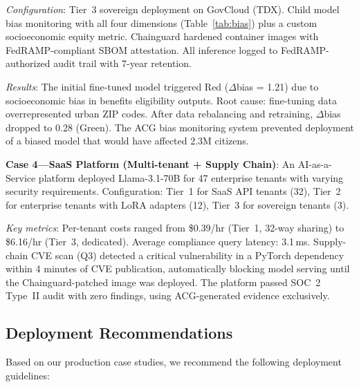 \documentclass[conference,10pt]{IEEEtran}
\begin{document}
\emph{Configuration}: Tier~3 sovereign deployment on GovCloud (TDX). Child model bias monitoring with all four dimensions (Table~\ref{tab:bias}) plus a custom socioeconomic equity metric. Chainguard hardened container images with FedRAMP-compliant SBOM attestation. All inference logged to FedRAMP-authorized audit trail with 7-year retention.

\emph{Results}: The initial fine-tuned model triggered Red ($\Delta$bias = 1.21) due to socioeconomic bias in benefits eligibility outputs. Root cause: fine-tuning data overrepresented urban ZIP codes. After data rebalancing and retraining, $\Delta$bias dropped to 0.28 (Green). The ACG bias monitoring system prevented deployment of a biased model that would have affected 2.3M citizens.

\textbf{Case 4---SaaS Platform (Multi-tenant + Supply Chain)}: An AI-as-a-Service platform deployed Llama-3.1-70B for 47 enterprise tenants with varying security requirements. Configuration: Tier~1 for SaaS API tenants (32), Tier~2 for enterprise tenants with LoRA adapters (12), Tier~3 for sovereign tenants (3).

\emph{Key metrics}: Per-tenant costs ranged from \$0.39/hr (Tier~1, 32-way sharing) to \$6.16/hr (Tier~3, dedicated). Average compliance query latency: 3.1\,ms. Supply-chain CVE scan (Q3) detected a critical vulnerability in a PyTorch dependency within 4 minutes of CVE publication, automatically blocking model serving until the Chainguard-patched image was deployed. The platform passed SOC~2 Type~II audit with zero findings, using ACG-generated evidence exclusively.

\subsection{Deployment Recommendations}

Based on our production case studies, we recommend the following deployment guidelines:

\begin{table}[!htbp]
\caption{Recommended Configuration by Industry Vertical}
\label{tab:recommend}
\centering\scriptsize
{}
\end{table}
\end{document}
